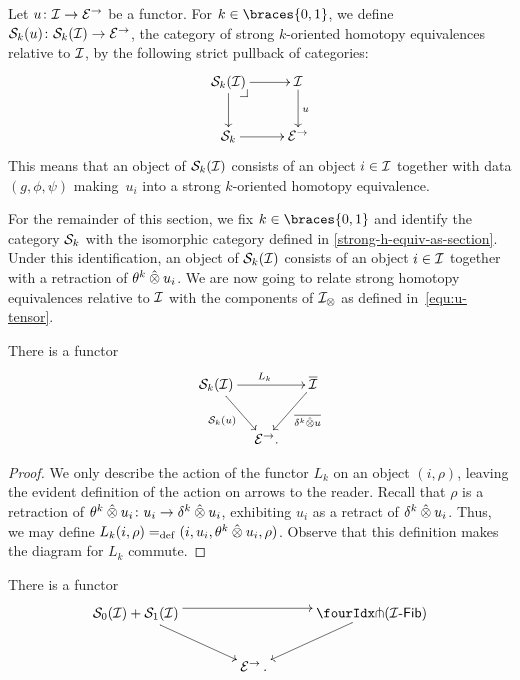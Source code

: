 \documentclass[reqno,10pt,a4paper,oneside,draft]{amsart}
\begin{document}
Let $u \co \cal{I} \to \catE^\to$ be a functor.
For $k \in \braces{0, 1}$, we define $\cal{S}_k(u) \co \cal{S}_k(\cal{I}) \to \catE^\to$,
the category of strong $k$-oriented homotopy equivalences relative to $\cal{I}$,
by the following strict pullback of categories:
\begin{equation} \label{rel-strong-h-equiv-def}
\xycenter{
  \cal{S}_k(\cal{I})
  \ar[r]
  \ar[d]
  \pullback{dr}
&
  \cal{I}
  \ar[d]^{u}
\\
  \cal{S}_k
  \ar[r]
&
  \catE^\to
}
\end{equation}
This means that an object of $\cal{S}_k(\cal{I})$ consists of an object $i \in \cal{I}$ together with data $(g, \phi, \psi)$ making~$u_i$ into a strong $k$-oriented homotopy equivalence.

For the remainder of this section, we fix $k \in \braces{0, 1}$ and identify the category $\cal{S}_k$ with the isomorphic category defined in \cref{strong-h-equiv-as-section}.
Under this identification, an object of $\cal{S}_k(\cal{I})$ consists of an object $i \in \cal{I}$ together with a retraction of $\thetak \hatotimes u_i$.
We are now going to relate strong homotopy equivalences relative to $\cal{I}$ with the components of $\cal{I}_\otimes$ as defined in~\eqref{equ:u-tensor}.

\begin{lemma} \label{lem:from-strong-hequiv}
There is a functor
\[
\xymatrix@!C@C-2em{
  \cal{S}_k(\cal{I})
  \ar[dr]_{\cal{S}_k(u)}
  \ar[rr]^{L_k}
&&
  \overline{\cal{I}}
  \ar[dl]^-{\overline{\kcyl \hatotimes u}}
\\&
  \catE^\to
\rlap{.}}
\]
\end{lemma}

\begin{proof}
We only describe the action of the functor $L_k$ on an object $(i, \rho)$, leaving the evident definition of the action on arrows to the reader.
Recall that $\rho$ is a retraction of $\thetak \hatotimes u_i \co u_i \to \kcyl \hatotimes u_i$, exhibiting $u_i$ as a retract of $\kcyl \hatotimes u_i$.
Thus, we may define $L_k(i, \rho) \defeq (i, u_i, \thetak \hatotimes u_i, \rho)$.
Observe that this definition makes the diagram for $L_k$ commute.
\end{proof}

\begin{proposition} \label{thm:onedir} There is a functor
\[
\xymatrix@!C@C-2.5em{
\cal{S}_0(\cal{I}) + \cal{S}_1(\cal{I})
  \ar[dr]
  \ar@<4pt>[rr] 
&&
  \liftl{(\Fib{\cal{I}})}
  \ar[dl]
\\&
  \catE^\to \, .
}
\]
\end{proposition}
\end{document}
